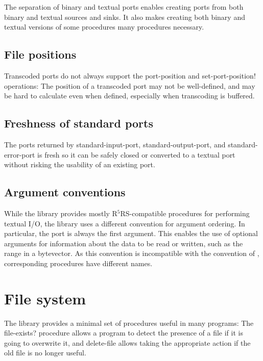 \documentclass[twoside,twocolumn]{algol60}
\newcommand{\rn}[1]{R$^{#1}$RS}
\begin{document}
The separation of binary and textual ports enables creating ports from
both binary and textual sources and sinks.  It also makes creating
both binary and textual versions of some procedures many procedures
necessary.

\section{File positions}

Transcoded ports do not always support the {\cf port-position} and
{\cf set-port-position!} operations: The position of a transcoded port
may not be well-defined, and may be hard to calculate even when
defined, especially when transcoding is buffered.

\section{Freshness of standard ports}

The ports returned by {\cf standard-input-port}, {\cf
  standard-output-port}, and {\cf standard-error-port} is fresh so it
can be safely closed or converted to a textual port without risking
the usability of an existing port.


\section{Argument conventions}

While the  library provides mostly
\rn{5}-compatible procedures for performing textual I/O, the
 library uses a different convention for
argument ordering.  In particular, the port is always the first
argument.  This enables the use of optional arguments for information
about the data to be read or written, such as the range in a
bytevector.  As this convention is incompatible with the convention of
, corresponding procedures have different
names.

\chapter{File system}

The  library provides a minimal set of procedures
useful in many programs: The {\cf file-exists?} procedure allows a
program to detect the presence of a file if it is going to overwrite
it, and {\cf delete-file} allows taking the appropriate action if the
old file is no longer useful.
\end{document}
